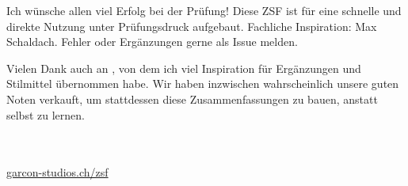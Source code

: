 
\begin{defbox}[][weight=quiet]
Ich wünsche allen viel Erfolg bei der Prüfung! Diese ZSF ist für eine schnelle und direkte Nutzung unter Prüfungsdruck aufgebaut. Fachliche Inspiration: Max Schaldach. Fehler oder Ergänzungen gerne als Issue melden.

Vielen Dank auch an , von dem ich viel Inspiration für Ergänzungen und Stilmittel übernommen habe. Wir haben inzwischen wahrscheinlich unsere guten Noten verkauft, um stattdessen diese Zusammenfassungen zu bauen, anstatt selbst zu lernen.

\ZSFgap[S]
\\
\\
\href{https://garcon-studios.ch/zsf}{garcon-studios.ch/zsf}
\end{defbox}
